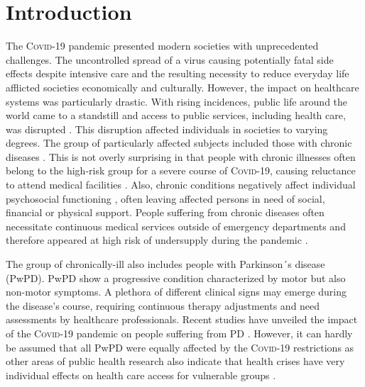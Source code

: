 \documentclass[a4paper,oneside,11pt,english]{scrartcl}
\begin{document}
\section*{Introduction}
The \textsc{Covid}-19 pandemic presented modern societies with unprecedented challenges. The uncontrolled spread of a virus causing potentially fatal side effects despite intensive care and the resulting necessity to reduce everyday life afflicted societies economically and culturally. However, the impact on healthcare systems was particularly drastic. With rising incidences, public life around the world came to a standstill and access to public services, including health care, was disrupted \cite{nunez2021access, moynihan2021impact, world2020impact}. This disruption affected individuals in societies to varying degrees. The group of particularly affected subjects included those with chronic diseases \cite{sepulveda2020impact, kasar2021life, yogev2021covid, scheidt2021care}. This is not overly surprising in that people with chronic illnesses often belong to the high-risk group for a severe course of \textsc{Covid}-19, causing reluctance to attend medical facilities \cite{feral2020collateral}. Also, chronic conditions negatively affect individual psychosocial functioning \cite{demirtepe2022psychosocial}, often leaving affected persons in need of social, financial or physical support. People suffering from chronic diseases often necessitate continuous medical services outside of emergency departments and therefore appeared at high risk of undersupply during the pandemic \cite{scheidt2021care, nunez2021access, world2020impact}. 

The group of chronically-ill also includes people with Parkinson´s disease (Pw\textsc{PD}). Pw\textsc{PD} show a progressive condition characterized by motor but also non-motor symptoms. A plethora of different clinical signs may emerge during the disease's course, requiring continuous therapy adjustments and need assessments by healthcare professionals. Recent studies have unveiled the impact of the \textsc{Covid}-19 pandemic on people suffering from \textsc{PD} \cite{yogev2021covid, zipprich2020knowledge, frundt2022impact, richter2021analysis, brooks2021social}. However, it can hardly be assumed that all Pw\textsc{PD} were equally affected by the \textsc{Covid}-19 restrictions as other areas of public health research also indicate that health crises have very individual effects on health care access for vulnerable groups \cite{huijts2017prevalence, lowcock2012social, whocovidbrief}. 
\end{document}
